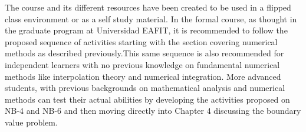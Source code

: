 The course and its different resources have been created to be used in a flipped class environment or as a self study material. In the formal course, as thought in the graduate program at Universidad EAFIT, it is recommended to follow the proposed sequence of activities starting with the section covering numerical methods as described previously.This same sequence is also recommended for independent learners with no previous knowledge on fundamental numerical methods like interpolation theory and numerical integration. More advanced students, with previous backgrounds on mathematical analysis and numerical methods can test their actual abilities by developing the activities proposed on NB-4 and NB-6 and then moving directly into Chapter 4 discussing the boundary value problem.




